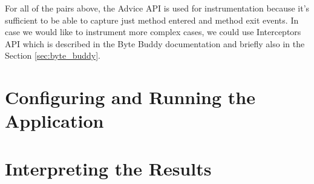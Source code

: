 For all of the pairs above, the Advice API is used for instrumentation because it's sufficient to be able to capture just method entered and method exit events. In case we would like to instrument more complex cases, we could use Interceptors API which is described in the Byte Buddy documentation and briefly also in the Section \ref{sec:byte_buddy}.


\section{Configuring and Running the Application}

\section{Interpreting the Results}